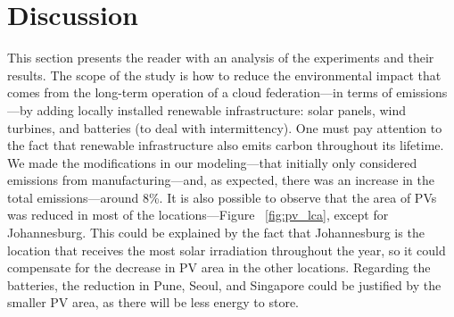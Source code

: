 










\section{Discussion}
\label{sec:long_term_discussion}

This section presents the reader with an analysis of the experiments and their results. The scope of the study is how to reduce the environmental impact that comes from the long-term operation of a cloud federation---in terms of  emissions---by adding locally installed renewable infrastructure: solar panels, wind turbines, and batteries (to deal with intermittency). One must pay attention to the fact that renewable infrastructure also emits carbon throughout its lifetime. We made the modifications in our modeling---that initially only considered emissions from manufacturing---and, as expected, there was an increase in the total emissions---around 8\%. It is also possible to observe that the area of PVs was reduced in most of the locations---Figure ~\ref{fig:pv_lca}, except for Johannesburg. This could be explained by the fact that Johannesburg is the location that receives the most solar irradiation throughout the year, so it could compensate for the decrease in PV area in the other locations. Regarding the batteries, the reduction in Pune, Seoul, and Singapore could be justified by the smaller PV area, as there will be less energy to store.

